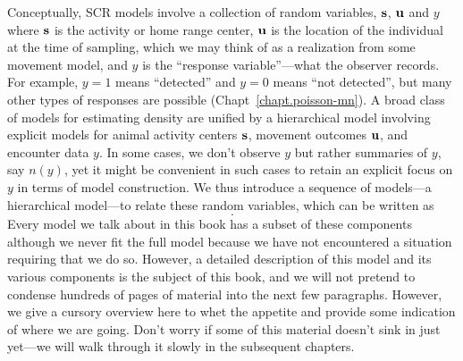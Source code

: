 Conceptually, SCR models involve a collection of random
variables, ${\bf s}$, ${\bf u}$ and $y$ where ${\bf s}$ is the
activity or home range center, ${\bf u}$ is the location of the
individual at the time of sampling,
which we may think of as a realization from some movement
model, and $y$ is the ``response variable''---what the observer
records. For example, $y=1$ means ``detected'' and $y=0$ means ``not
detected'', but many other types of responses are possible
(Chapt~\ref{chapt.poisson-mn}).
A broad class of models for estimating density are unified by a
hierarchical model involving explicit models for
animal activity centers ${\bf s}$, movement outcomes ${\bf u}$, and
encounter data $y$.  In some cases, we don't observe $y$ but rather
summaries of $y$, say $n(y)$, yet it might be convenient in such cases
to retain an explicit focus on $y$ in terms of model construction.
We thus introduce a sequence of models---a hierarchical model---to
relate these random variables, which can be written as
%
\begin{equation}
[n(y)|y][y|{\bf u}][{\bf u}|{\bf s}][{\bf s}].
\label{modeling.eq.nyus}
\end{equation}
Every model we talk about in this book has
a subset of these components   %
although we never fit the
full model because we have not encountered a situation requiring that
we do so. However,
a detailed  description of this model and its various components
is the subject of this book, and we will not pretend to
condense hundreds of pages of material into the next few
paragraphs. However, we give a cursory overview here to whet the appetite and provide some
indication of where we are going. Don't worry if some of this material
doesn't sink in just yet---we will walk through it
slowly in the subsequent chapters.

